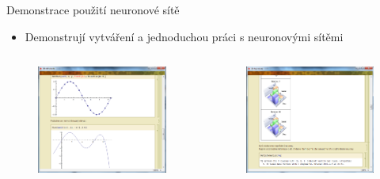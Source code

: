 \documentclass{beamer}
\begin{document}
\begin{frame}{Demonstrace použití neuronové sítě}
\begin{itemize}
\item Demonstrují vytváření a jednoduchou práci s neuronovými sítěmi
\end{itemize} 
  \begin{columns}[T]
    \column{5cm}
      \begin{figure}
   \includegraphics[width=5.5cm]{uk3.png}
\end{figure}
    \column{5cm}
      \begin{figure}
   \includegraphics[width=5.5cm]{uk4.png}
\end{figure}
  \end{columns}
\end{frame}
\end{document}
